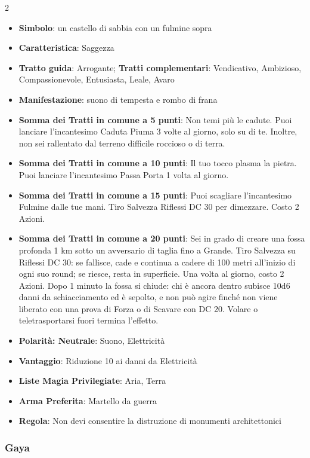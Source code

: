 \begin{multicols}{2}
\begin{itemize}[leftmargin=*] \setlength{\itemsep}{0pt}
\item \textbf{Simbolo}: un castello di sabbia con un fulmine sopra
\item \textbf{Caratteristica}: Saggezza
\item \textbf{Tratto guida}: Arrogante; \textbf{Tratti complementari}: Vendicativo, Ambizioso, Compassionevole, Entusiasta, Leale, Avaro
\item \textbf{Manifestazione}: suono di tempesta e rombo di frana
\item \textbf{Somma dei Tratti in comune a 5 punti}: Non temi più le cadute. Puoi lanciare l'incantesimo Caduta Piuma 3 volte al giorno, solo su di te. Inoltre, non sei rallentato dal terreno difficile roccioso o di terra.
\item \textbf{Somma dei Tratti in comune a 10 punti}: Il tuo tocco plasma la pietra. Puoi lanciare l'incantesimo Passa Porta 1 volta al giorno.
\item \textbf{Somma dei Tratti in comune a 15 punti}: Puoi scagliare l'incantesimo Fulmine dalle tue mani. Tiro Salvezza Riflessi DC 30 per dimezzare. Costo 2 Azioni.
\item \textbf{Somma dei Tratti in comune a 20 punti}: Sei in grado di creare una fossa profonda 1 km sotto un avversario di taglia fino a Grande. Tiro Salvezza su Riflessi DC 30: se fallisce, cade e continua a cadere di 100 metri all'inizio di ogni suo round; se riesce, resta in superficie. Una volta al giorno, costo 2 Azioni. Dopo 1 minuto la fossa si chiude: chi è ancora dentro subisce 10d6 danni da schiacciamento ed è sepolto, e non può agire finché non viene liberato con una prova di Forza o di Scavare con DC 20. Volare o teletrasportarsi fuori termina l'effetto.
\item \textbf{Polarità: Neutrale}: Suono, Elettricità
\item \textbf{Vantaggio}: Riduzione 10 ai danni da Elettricità
\item \textbf{Liste Magia Privilegiate}: Aria, Terra
\item \textbf{Arma Preferita}: Martello da guerra
\item \textbf{Regola}: Non devi consentire la distruzione di monumenti architettonici
\end{itemize}

\subsubsection{Gaya}\label{gaya}\hypertarget{gaya}{}


\end{multicols}
